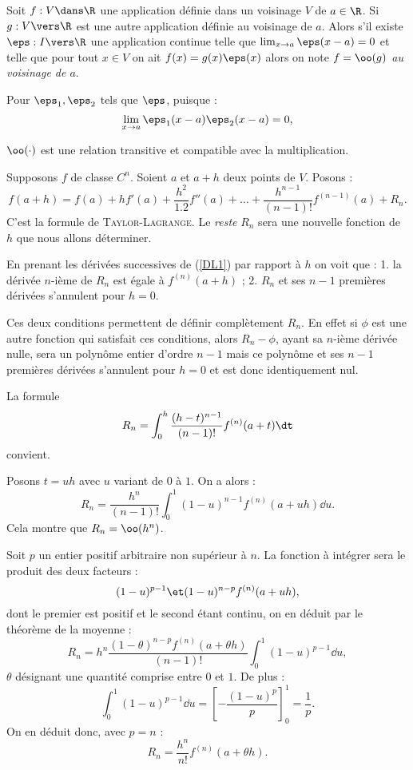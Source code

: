 \documentclass{mybourbaki}
\begin{document}
\propt{} Soit $f : V \dans \R$ une application définie dans un voisinage $V$ de $a\in \R$. Si $g : V\vers\R$ est une autre application définie au voisinage de $a$. Alors s'il existe $\eps : I \vers \R$ une application continue telle que $\lim_{x\to a}\eps(x-a) = 0$ et telle que pour tout $x\in V$ on ait $f(x) = g(x)\eps(x)$ alors on note \textit{$f = \oo(g)$ au voisinage de $a$}.

Pour $\eps_1,\eps_2$ tels que $\eps$, puisque : \[ \lim_{x\to a} \eps_1(x-a)\eps_2(x-a)  = 0,\]

\propt{} $\oo(\cdot)$ est une relation transitive et compatible avec la multiplication.
\bigbreak

\propt{} Supposons $f$ de classe $C^n$. Soient $a$ et $a+h$ deux points de $V$. Posons : 
\begin{equation}
f(a+h) = f(a) + hf'(a) + \frac{h^{2}}{1.2}f''(a) + \ldots + \frac{h^{n-1}}{(n-1)!}f^{(n-1)}(a) + R_n. \label{DL1}
\end{equation}
C'est la formule de \textsc{Taylor-Lagrange}.
Le \textit{reste} $R_n$ sera une nouvelle fonction de $h$ que nous allons déterminer.

En prenant les dérivées successives de (\ref{DL1}) par rapport à $h$ on voit que : 1. la dérivée $n$-ième de $R_n$ est égale à $f^{(n)}(a+h)$ ; 2. $R_n$ et ses $n-1$ premières dérivées s'annulent pour $h=0$.

Ces deux conditions permettent de définir complètement $R_n$. En effet si $\phi$ est une autre fonction qui satisfait ces conditions, alors $R_n-\phi$, ayant sa $n$-ième dérivée nulle, sera un polynôme entier d'ordre $n-1$ mais ce polynôme et ses $n-1$ premières dérivées s'annulent pour $h=0$ et est donc identiquement nul.

La formule \[ R_n = \int_{0}^{h}\frac{(h-t)^{n-1}}{(n-1)!}f^{(n)}(a+t)\dt\]convient.

\propt{} Posons $t = uh$ avec $u$ variant de $0$ à $1$. On a alors : \[R_n = \frac{h^{n}}{(n-1)!}\int_{0}^{1}(1-u)^{n-1}f^{(n)}(a+uh)\dd u.\]Cela montre que $R_n = \oo(h^{n})$.

\propt{} Soit $p$ un entier positif arbitraire non supérieur à $n$. La fonction à intégrer sera le produit des deux facteurs : \[(1-u)^{p-1} \et (1-u)^{n-p}f^{(n)}(a+uh), \]dont le premier est positif et le second étant continu, on en déduit par le théorème de la moyenne : \[ R_n = h^{n}\frac{(1-\theta)^{n-p}f^{(n)}(a+\theta h)}{(n-1)!}\int_{0}^{1}(1-u)^{p-1}\dd u,\]$\theta$ désignant une quantité comprise entre $0$ et $1$. De plus : \[ \int_{0}^{1} (1-u)^{p-1}\dd u = \left[ -\frac{(1-u)^{p}}{p}\right]^{1}_0 = \frac{1}{p}.\]On en déduit donc, avec $p=n$ : \[ R_n = \frac{h^{n}}{n!}f^{(n)}(a+\theta h).\]
\end{document}
